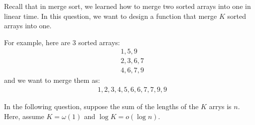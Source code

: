 
Recall that in merge sort, we learned how to merge two sorted arrays into one in linear time. In this question, we want to design a function that merge $K$ sorted arrays into one.

For example, here are 3 sorted arrays:
\begin{align*}
    &1,5,9\\
    &2,3,6,7\\
    &4,6,7,9
\end{align*}
and we want to merge them as:
\begin{align*}
    &1,2,3,4,5,6,6,7,7,9,9
\end{align*}

In the following question, suppose the sum of the lengths of the $K$ arrys is $n$. Here, assume $K=\omega(1)$ and $\log K=o(\log n)$.

